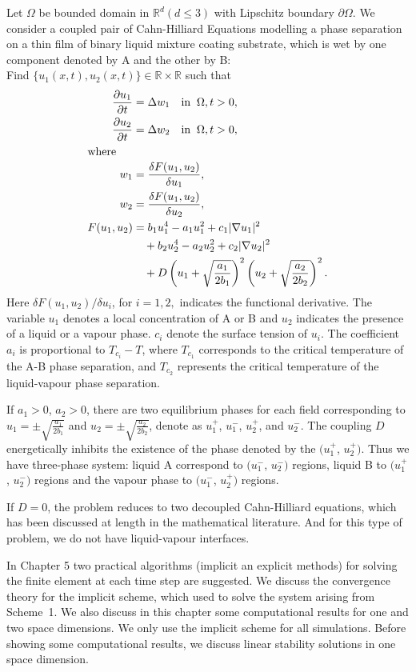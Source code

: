 Let $\Omega$ be bounded domain in ${\mathbb R}^d (d\leq3)$ with
Lipschitz boundary $\partial\Omega.$  We consider a coupled pair of
Cahn-Hilliard Equations modelling a phase separation on a thin
film of binary liquid mixture coating substrate, which is wet by one
component denoted by A and the other by B:\\
Find $\{u_1(x,t),u_2(x,t)\}\in {\mathbb R}\times {\mathbb R}$ such
that
\eqlabon 
\begin{align} 
\frac{\partial u_{1}}{\partial t}&  = \Delta w_{1} \quad  \mbox{in}\;\;\Omega,t>0, \label{1a0001a}\\ 
\frac{\partial u_{2}}{\partial t}&  = \Delta w_{2} \quad \mbox{in}\;\;\Omega,t>0 ,\label{1a0001b}\\
\intertext{where}
w_{1}  &=  \frac{\delta F(u_{1},u_{2})}{\delta u_{1}}, \label{1a0001c}\\
w_{2}  &=  \frac{\delta F(u_{1},u_{2})}{\delta u_{2}},\label{1a0001d}\\ 
F(u_{1},u_{2})   &=   b_1u_1^4- a_1u_1^2+c_1|\nabla u_1|^2 \nonumber\\
   &\quad  + b_2u_2^4-  a_2u_2^2+c_2|\nabla u_2|^2 \nonumber\\
   &\quad  + D \left(u_1+ \sqrt{\frac{a_1}{2b_1}}\right )^2  \left(u_2+
       \sqrt{\frac{a_2}{2b_2}}\right)^2.\label{1a0001e}
\end{align}
Here ${\delta F}(u_{1},u_{2})/{\delta u_{i}}$, for $i=1,2,$ indicates the functional derivative.
The variable $u_1$ denotes a local concentration of A or B and $u_2$ indicates
the presence of a liquid or a vapour phase. $c_i$ denote the surface
tension of $u_i$.  The coefficient $a_i$ is proportional
to $T_{c_i}-T$, where $T_{c_1}$ corresponds to the critical
temperature of the A-B phase separation, and $T_{c_2}$ represents the critical
temperature of the
liquid-vapour phase separation.
\eqlaboff


If $a_1>0$, $ a_2 >0$, there
are two equilibrium phases for each field corresponding to $u_1 = \pm
\sqrt{\frac{a_1}{2b_1}}$ and $u_2 = \pm \sqrt{\frac{a_2}{2b_2}}$,
denote as $u_1^+$, $u_1^-$, $u_2^+$, and $u_2^-$.  The coupling $D$
energetically inhibits the existence of the phase denoted by the
$(u_1^+$, $u_2^+)$.  Thus we have three-phase system: liquid A
correspond to $(u_1^-$, $u_2^-)$ regions, liquid B to $(u_1^+$,
$u_2^-)$ regions and the vapour phase to $(u_1^-$, $u_2^+)$ regions.

If $D=0$, the problem reduces to two decoupled Cahn-Hilliard equations, which has
been discussed at length in the mathematical literature.  And for this type of problem, we do not have
liquid-vapour interfaces.

In Chapter 5 two practical algorithms (implicit an explicit methods)
for solving the finite element at each time step are suggested.    We
discuss the convergence theory for the implicit scheme, which used to
solve the system arising from Scheme~1.   We also discuss  in this
chapter some computational results for one and two space dimensions.
We only use the implicit scheme for all simulations. Before showing
some computational results, we discuss linear stability solutions in
one space dimension.


